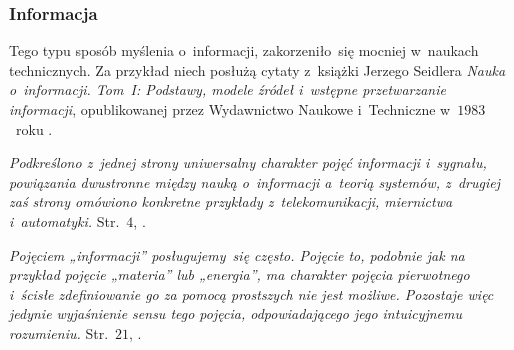 \documentclass[10pt,t]{beamer}
\begin{document}
\begin{frame}
  \frametitle{Informacja}


  Tego typu sposób myślenia o~informacji, zakorzeniło~się mocniej
  w~naukach technicznych. Za przykład niech posłużą cytaty z~książki
  Jerzego Seidlera
  \textit{Nauka o~informacji. Tom~I: Podstawy, modele źródeł i~wstępne
    przetwarzanie informacji}, opublikowanej przez Wydawnictwo Naukowe
  i~Techniczne w~$1983$~roku
  \parencite{Seidler-Nauka-o-informacji-Vol-I-Pub-1983}.

  \textit{Podkreślono z~jednej strony uniwersalny charakter pojęć
    informacji i~sygnału, powiązania dwustronne między nauką o~informacji
    a~teorią systemów, z~drugiej zaś strony omówiono konkretne przykłady
    z~telekomunikacji, miernictwa i~automatyki.} Str.~$4$,
  \parencite{Seidler-Nauka-o-informacji-Vol-I-Pub-1983}.

  \textit{Pojęciem „informacji” posługujemy~się często. Pojęcie to,
    podobnie jak na przykład pojęcie „materia” lub „energia”, ma charakter
    pojęcia pierwotnego i~ścisłe zdefiniowanie go za pomocą prostszych nie
    jest możliwe. Pozostaje więc jedynie wyjaśnienie sensu tego pojęcia,
    odpowiadającego jego intuicyjnemu rozumieniu.} Str.~$21$,
  \parencite{Seidler-Nauka-o-informacji-Vol-I-Pub-1983}.

\end{frame}











\end{document}

